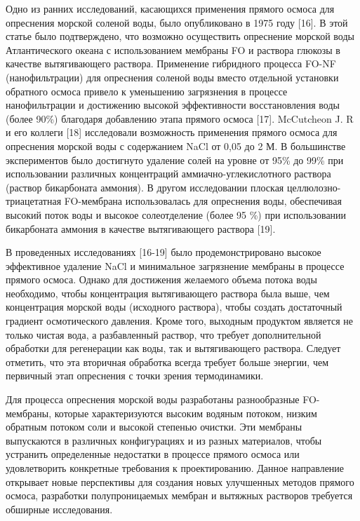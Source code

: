 Одно из ранних исследований, касающихся применения прямого осмоса для
опреснения морской соленой воды, было опубликовано в 1975 году {[}16{]}.
В этой статье было подтверждено, что возможно осуществить опреснение
морской воды Атлантического океана с использованием мембраны FO и
раствора глюкозы в качестве вытягивающего раствора. Применение
гибридного процесса FO-NF (нанофильтрации) для опреснения соленой воды
вместо отдельной установки обратного осмоса привело к уменьшению
загрязнения в процессе нанофильтрации и достижению высокой эффективности
восстановления воды (более 90\%) благодаря добавлению этапа прямого
осмоса {[}17{]}. McCutcheon J. R и его коллеги {[}18{]} исследовали
возможность применения прямого осмоса для опреснения морской воды с
содержанием NaCl от 0,05 до 2 М. В большинстве экспериментов было
достигнуто удаление солей на уровне от 95\% до 99\% при использовании
различных концентраций аммиачно-углекислотного раствора (раствор
бикарбоната аммония). В другом исследовании плоская
целлюлозно-триацетатная FO-мембрана использовалась для опреснения воды,
обеспечивая высокий поток воды и высокое солеотделение (более 95 \%) при
использовании бикарбоната аммония в качестве вытягивающего раствора
{[}19{]}.

В проведенных исследованиях {[}16-19{]} было продемонстрировано высокое
эффективное удаление NaCl и минимальное загрязнение мембраны в процессе
прямого осмоса. Однако для достижения желаемого объема потока воды
необходимо, чтобы концентрация вытягивающего раствора была выше, чем
концентрация морской воды (исходного раствора), чтобы создать
достаточный градиент осмотического давления. Кроме того, выходным
продуктом является не только чистая вода, а разбавленный раствор, что
требует дополнительной обработки для регенерации как воды, так и
вытягивающего раствора. Следует отметить, что эта вторичная обработка
всегда требует больше энергии, чем первичный этап опреснения с точки
зрения термодинамики.

Для процесса опреснения морской воды разработаны разнообразные
FO-мембраны, которые характеризуются высоким водяным потоком, низким
обратным потоком соли и высокой степенью очистки. Эти мембраны
выпускаются в различных конфигурациях и из разных материалов, чтобы
устранить определенные недостатки в процессе прямого осмоса или
удовлетворить конкретные требования к проектированию. Данное направление
открывает новые перспективы для создания новых улучшенных методов
прямого осмоса, разработки полупроницаемых мембран и вытяжных растворов
требуется обширные исследования.

